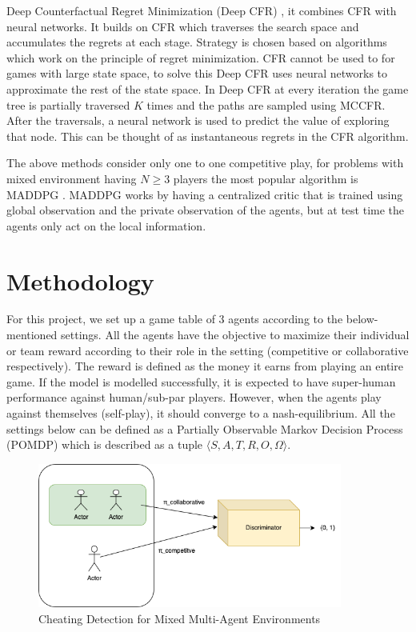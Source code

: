 \documentclass{article}
\begin{document}
Deep Counterfactual Regret Minimization (Deep CFR) \cite{dcfr:2018}, it combines CFR with neural networks. It builds on CFR which traverses the search space and accumulates the regrets at each stage. Strategy is chosen based on algorithms which work on the principle of regret minimization. CFR cannot be used to for games with large state space, to solve this Deep CFR uses neural networks to approximate the rest of the state space. In Deep CFR at every iteration the game tree is partially traversed $K$ times and the paths are sampled using MCCFR. After the traversals, a neural network is used to predict the value of exploring that node. This can be thought of as instantaneous regrets in the CFR algorithm. 

The above methods consider only one to one competitive play, for problems with mixed environment having $N \geq 3$ players the most popular algorithm is MADDPG \cite{maddpg}. MADDPG works by having a centralized critic that is trained using global observation and the private observation of the agents, but at test time the agents only act on the local information.

\section{Methodology}

For this project, we set up a game table of 3 agents according to the below-mentioned settings. All the agents have the objective to maximize their individual or team reward according to their role in the setting (competitive or collaborative respectively). The reward is defined as the money it earns from playing an entire game. If the model is modelled successfully, it is expected to have super-human performance against human/sub-par players. However, when the agents play against themselves (self-play), it should converge to a nash-equilibrium. All the settings below can be defined as a Partially Observable Markov Decision Process (POMDP) which is described as a tuple $\langle S, A, T, R, O, \Omega \rangle$.

\begin{figure}[h]
    \centering
    \includegraphics[width=10cm]{./images/framework.png}
    \caption{Cheating Detection for Mixed Multi-Agent Environments}
    \label{fig:cheating}
\end{figure}
\end{document}
